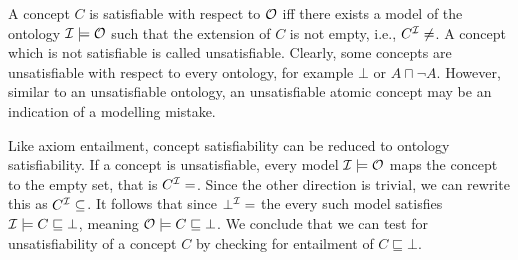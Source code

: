 A concept $C$ is satisfiable with respect to $\mathcal{O}$ iff there exists a model of the ontology $\mathcal{I} \models \mathcal{O}$ such that the extension of $C$ is not empty, i.e., $C^\Imc \not= \empty$. A concept which is not satisfiable is called unsatisfiable. Clearly, some concepts are unsatisfiable with respect to every ontology, for example $\bot$ or $A \sqcap \lnot A$. However, similar to an unsatisfiable ontology, an unsatisfiable atomic concept may be an indication of a modelling mistake.

Like axiom entailment, concept satisfiability can be reduced to ontology satisfiability. If a concept is unsatisfiable, every model $\mathcal{I} \models \mathcal{O}$ maps the concept to the empty set, that is $C^\Imc = \empty$. Since the other direction is trivial, we can rewrite this as $C^\Imc \subseteq \empty$. It follows that since $\bot^\Imc = \empty$ the every such model satisfies $\mathcal{I} \models C \sqsubseteq \bot$, meaning $\mathcal{O} \models C \sqsubseteq \bot$. We conclude that we can test for unsatisfiability of a concept $C$ by checking for entailment of $C \sqsubseteq \bot$.
